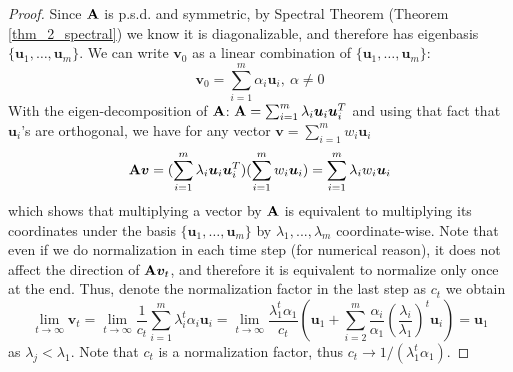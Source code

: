 \documentclass[../main.tex]{subfiles}
\begin{document}
\begin{proof}
	Since ${\bf A}$ is p.s.d. and symmetric, by Spectral Theorem (Theorem \ref{thm_2_spectral}) we know it is diagonalizable, and therefore has eigenbasis $\{\bm{u}_1,\dots,\bm{u}_m\}$. We can write $\bm{v}_0$ as a linear combination of $\{\bm{u}_1,\dots,\bm{u}_m\}$:
	\begin{equation*}
	\bm{v}_0 = \sum_{i=1}^{m} \alpha_i \bm{u}_i,\ \alpha\neq0
	\end{equation*}
	With the eigen-decomposition of ${\bf A}$: ${\bf A}= \sum_{i=1}^m \lambda_i\bm{u}_i\bm{u}_i^T $ and using that fact that $\bm{u}_i$'s are orthogonal, we have for any vector $\bm{v} = \sum_{i=1}^{m} w_i \bm{u}_i$
	\begin{equation*}
	{\bf A}\bm{v} = (\sum_{i=1}^m \lambda_i\bm{u}_i\bm{u}_i^T)(\sum_{i=1}^{m} w_i \bm{u}_i) = \sum_{i=1}^{m} \lambda_i w_i \bm{u}_i
	\end{equation*}
	which shows that multiplying a vector by ${\bf A}$ is equivalent to multiplying its coordinates under the basis $\{\bm{u}_1,\dots,\bm{u}_m\}$ by $\lambda_1, ..., \lambda_m$ coordinate-wise. Note that even if we do normalization in each time step (for numerical reason), it does not affect the direction of ${\bf A}\bm{v}_t$, and therefore it is equivalent to normalize only once at the end. Thus, denote the normalization factor in the last step as $c_t$ we obtain
	\begin{equation*}
	\lim_{t\rightarrow \infty}\bm{v}_t = \lim_{t\rightarrow \infty}\frac{1}{c_t}\sum_{i=1}^{m} \lambda_i^t \alpha_i \bm{u}_i = \lim_{t\rightarrow \infty}\frac{\lambda_1^t\alpha_1}{c_t} \left(\bm{u}_1 + \sum_{i=2}^{m} \frac{\alpha_i}{\alpha_1}\left(\frac{\lambda_i}{\lambda_1}\right)^t\bm{u}_i\right) = \bm{u}_1
	\end{equation*}
	as $\lambda_j<\lambda_1$. Note that $c_t$ is a normalization factor, thus $c_t\rightarrow 1/(\lambda_1^t\alpha_1)$.
\end{proof}
\end{document}
